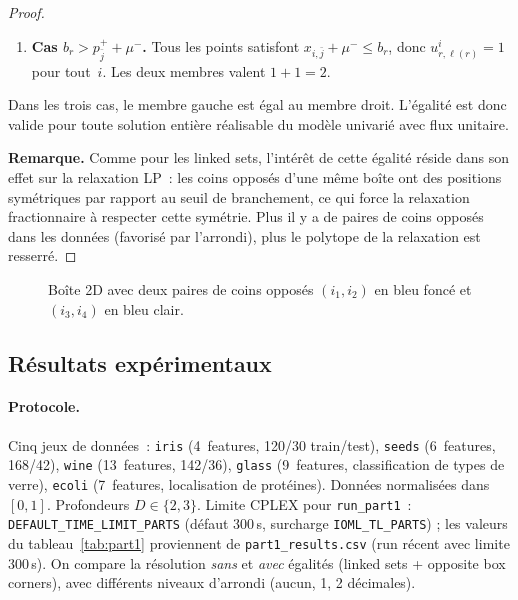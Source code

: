 \documentclass[a4paper,10pt,titlepage,leqno]{article}
\begin{document}
\begin{theorybox}
\begin{proof}
\begin{enumerate}[leftmargin=2em]
  \item \textbf{Cas $b_r > p^+_{\bar{j}} + \mu^-$.} Tous les points satisfont $x_{i,\bar{j}} + \mu^- \leq b_r$, donc $u^i_{r,\ell(r)} = 1$ pour tout~$i$. Les deux membres valent $1 + 1 = 2$.
\end{enumerate}

Dans les trois cas, le membre gauche est égal au membre droit. L'égalité est donc valide pour toute solution entière réalisable du modèle univarié avec flux unitaire.

\textbf{Remarque.} Comme pour les linked sets, l'intérêt de cette égalité réside dans son effet sur la relaxation LP~: les coins opposés d'une même boîte ont des positions symétriques par rapport au seuil de branchement, ce qui force la relaxation fractionnaire à respecter cette symétrie. Plus il y a de paires de coins opposés dans les données (favorisé par l'arrondi), plus le polytope de la relaxation est resserré. \qedhere
\end{proof}
\end{theorybox}

\begin{figure}[H]
\centering
{}
\caption{Boîte 2D avec deux paires de coins opposés $(i_1,i_2)$ en bleu foncé et $(i_3,i_4)$ en bleu clair.}
\label{fig:box}
\end{figure}

\subsection{Résultats expérimentaux}

\paragraph{Protocole.} Cinq jeux de données~: \texttt{iris} (4~features, 120/30 train/test), \texttt{seeds} (6~features, 168/42), \texttt{wine} (13~features, 142/36), \texttt{glass} (9~features, classification de types de verre), \texttt{ecoli} (7~features, localisation de protéines). Données normalisées dans $[0,1]$. Profondeurs $D \in \{2,3\}$. Limite CPLEX pour \texttt{run\_part1}~: \texttt{DEFAULT\_TIME\_LIMIT\_PARTS} (défaut 300\,s, surcharge \texttt{IOML\_TL\_PARTS}) ; les valeurs du tableau~\ref{tab:part1} proviennent de \texttt{part1\_results.csv} (run récent avec limite 300\,s). On compare la résolution \emph{sans} et \emph{avec} égalités (linked sets + opposite box corners), avec différents niveaux d'arrondi (aucun, 1, 2 décimales).
\end{document}
